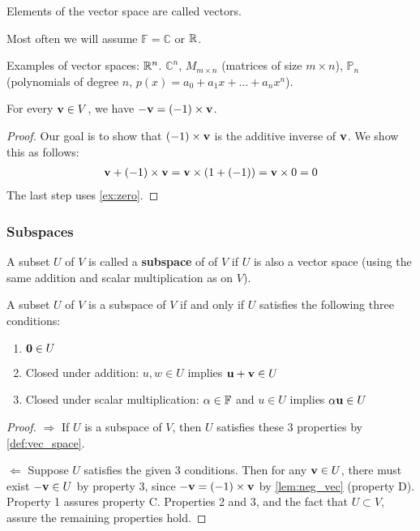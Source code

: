 \documentclass{article}
\begin{document}
Elements of the vector space are called vectors.

Most often we will assume $\mathbb{F} = \mathbb{C}$ or ${\mathbb{R}}$.

Examples of vector spaces: ${\mathbb{R}}^n$. $\mathbb{C}^n$, $M_{m \times n}$ (matrices of size $m \times n$), $\mathbb{P}_n$ (polynomials of degree $n$, $p(x) = a_0 + a_1 x + \ldots + a_n x^n$).

\begin{lemma}
\label{lem:neg_vec}
For every ${\mathbf{v}} \in V$, we have $-{\mathbf{v}} = (-1) \times {\mathbf{v}}$.
\end{lemma}
\begin{proof}
Our goal is to show that $(-1) \times {\mathbf{v}}$ is the additive inverse of ${\mathbf{v}}$.
We show this as follows:
\begin{align*}
    {\mathbf{v}} + (-1) \times {\mathbf{v}} = {\mathbf{v}} \times (1 + (-1)) = {\mathbf{v}} \times 0 = 0
\end{align*}
The last step uses \cref{ex:zero}.
\end{proof}

\subsubsection{Subspaces}

\begin{definition}
A subset $U$ of $V$ is called a \textbf{subspace} of of $V$ if $U$ is also a vector space (using the same addition and scalar multiplication as on $V$).
\end{definition}


\begin{proposition}\label{prop: characterization of subspace}
A subset $U$ of $V$ is a subspace of $V$ if
and only if $U$ satisfies the following three conditions:
\begin{enumerate}
\item  ${\mathbf{0}} \in U$
\item Closed under addition: $u,w\in U$ implies ${\mathbf{u}}+{\mathbf{v}} \in U$
\item Closed under scalar multiplication: $\alpha \in{\mathbb{F}}$ and $u\in U$
implies $\alpha {\mathbf{u}} \in U$
\end{enumerate}
\end{proposition}

\begin{proof}
$\Rightarrow$ If $U$ is a subspace of $V$, then $U$ satisfies these 3 properties by \cref{def:vec_space}.

$\Leftarrow$ Suppose $U$ satisfies the given 3 conditions. Then for any ${\mathbf{v}} \in U$, there must exist $-{\mathbf{v}} \in U$ by property 3, since $-{\mathbf{v}} = (-1) \times {\mathbf{v}}$ by \cref{lem:neg_vec} (property D). Property 1 assures property C. Properties 2 and 3, and the fact that $U \subset V$, assure the remaining properties hold. 

\end{proof}
\end{document}
